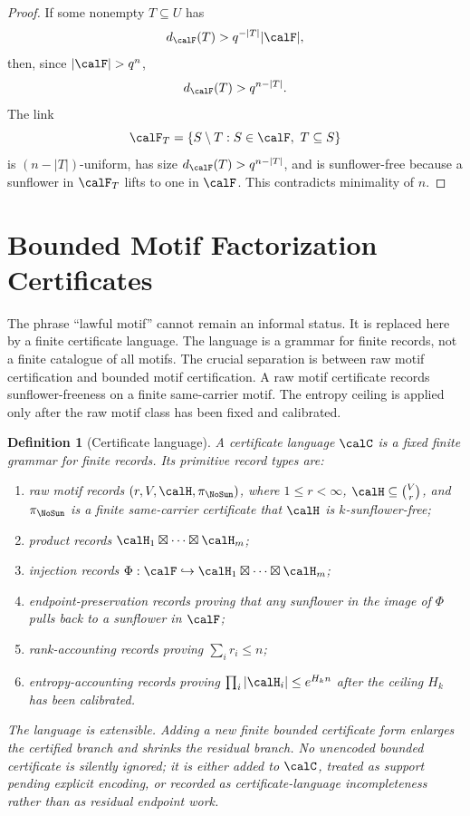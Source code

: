 \documentclass[11pt]{article}
\newtheorem{definition}[theorem]{Definition}
\begin{document}
\begin{proof}
If some nonempty \(T\subseteq U\) has
\[
  d_{\calF}(T)>q^{-|T|}|\calF|,
\]
then, since \(|\calF|>q^n\),
\[
  d_{\calF}(T)>q^{n-|T|}.
\]
The link
\[
  \calF_T=\{S\setminus T:S\in\calF,\ T\subseteq S\}
\]
is \((n-|T|)\)-uniform, has size \(d_{\calF}(T)>q^{n-|T|}\), and is sunflower-free because a sunflower in \(\calF_T\) lifts to one in \(\calF\).  This contradicts minimality of \(n\).
\end{proof}


\section{Bounded Motif Factorization Certificates}

The phrase ``lawful motif'' cannot remain an informal status.  It is replaced here by a finite certificate language.  The language is a grammar for finite records, not a finite catalogue of all motifs.  The crucial separation is between raw motif certification and bounded motif certification.  A raw motif certificate records sunflower-freeness on a finite same-carrier motif.  The entropy ceiling is applied only after the raw motif class has been fixed and calibrated.

\begin{definition}[Certificate language]
A certificate language \(\calC\) is a fixed finite grammar for finite records.  Its primitive record types are:
\begin{enumerate}[label=(\roman*)]
\item raw motif records \((r,V,\calH,\pi_{\NoSun})\), where \(1\le r<\infty\), \(\calH\subseteq\binom Vr\), and \(\pi_{\NoSun}\) is a finite same-carrier certificate that \(\calH\) is \(k\)-sunflower-free;
\item product records \(\calH_1\boxtimes\cdots\boxtimes\calH_m\);
\item injection records \(\Phi:\calF\hookrightarrow \calH_1\boxtimes\cdots\boxtimes\calH_m\);
\item endpoint-preservation records proving that any sunflower in the image of \(\Phi\) pulls back to a sunflower in \(\calF\);
\item rank-accounting records proving \(\sum_i r_i\le n\);
\item entropy-accounting records proving \(\prod_i |\calH_i|\le e^{H_k n}\) after the ceiling \(H_k\) has been calibrated.
\end{enumerate}
The language is extensible.  Adding a new finite bounded certificate form enlarges the certified branch and shrinks the residual branch.  No unencoded bounded certificate is silently ignored; it is either added to \(\calC\), treated as support pending explicit encoding, or recorded as certificate-language incompleteness rather than as residual endpoint work.
\end{definition}
\end{document}
